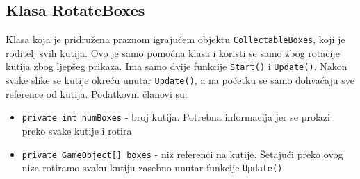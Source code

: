 \subsection{Klasa RotateBoxes}
Klasa koja je pridružena praznom igrajućem objektu \texttt{CollectableBoxes}, koji je roditelj svih kutija. Ovo je samo pomoćna klasa i koristi se samo zbog rotacije kutija zbog ljepšeg prikaza. Ima samo dvije funkcije \texttt{Start()} i \texttt{Update()}. Nakon svake slike se kutije okreću unutar \texttt{Update()}, a na početku se samo dohvaćaju sve reference od kutija. Podatkovni članovi su:
\begin{itemize}
	\item \texttt{private int numBoxes} - broj kutija. Potrebna informacija jer se prolazi preko svake kutije i rotira
	\item \texttt{private GameObject[] boxes} - niz referenci na kutije. Šetajući preko ovog niza rotiramo svaku kutiju zasebno unutar funkcije \newline \texttt{Update()} 
\end{itemize}